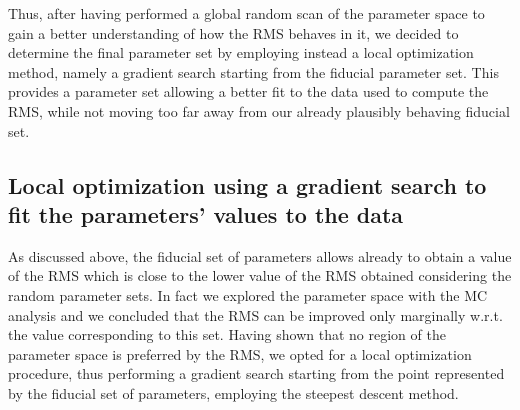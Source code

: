 \documentclass[oneside, 10pt, a4paper, twocolumn]{article}
\begin{document}
Thus, after having performed a global random scan of the parameter space to gain a better understanding of how the RMS {behaves} in it, we decided to determine the final parameter set by employing {instead} a local optimization method, namely a gradient search starting from the fiducial parameter set. 
This provides a parameter set allowing a better fit to the data used to compute the RMS, while not moving too far away from our already {plausibly} behaving fiducial set. 






\subsection{Local optimization using a gradient search to fit the parameters' values to the data}

As discussed above, the fiducial set of parameters allows already to obtain a value of the RMS {which is close to the lower value of the RMS obtained considering the random parameter sets. In fact we} explored the parameter space with the MC analysis and we concluded that the RMS can be improved only marginally w.r.t. the value corresponding to this set. %
Having shown that no region of the parameter space is preferred by the RMS, we opted for a local optimization procedure, thus performing a gradient search starting from the point represented by the fiducial set of parameters, 
employing the steepest descent method. 
\end{document}
